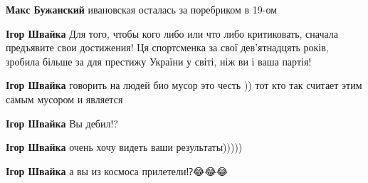 \begin{itemize}
\begin{itemize}
\textbf{Макс Бужанский} ивановская осталась за поребриком в 19-ом

 
\textbf{Ігор Швайка}
Для того, чтобы кого либо или что либо критиковать, сначала предъявите свои достижения!
Ця спортсменка за свої дев'ятнадцять років, зробила більше за для престижу України у світі, ніж ви і ваша партія!

 
\textbf{Ігор Швайка} говорить на людей био мусор это честь )) тот кто так считает этим самым мусором и является

 
\textbf{Ігор Швайка} Вы дебил!?

 
\textbf{Ігор Швайка} очень хочу видеть ваши результаты)))))

 
\textbf{Ігор Швайка} а вы из космоса прилетели⁉️😂😂😂

 

\end{itemize}
\end{itemize}
